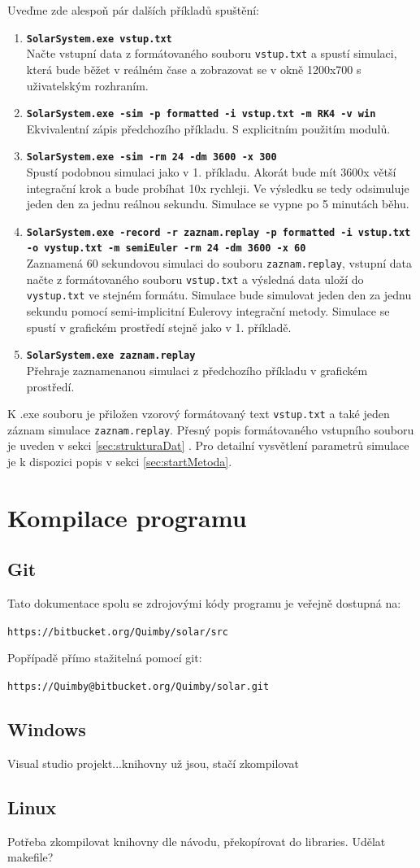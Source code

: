 Uveďme zde alespoň pár dalších příkladů spuštění:
\begin{enumerate}
	\item \texttt{\textbf{SolarSystem.exe vstup.txt}} \\
	Načte vstupní data z formátovaného souboru \texttt{vstup.txt} a spustí simulaci, která bude běžet v reálném čase a zobrazovat se v okně 1200x700 s uživatelským rozhraním.
	\item \texttt{\textbf{SolarSystem.exe -sim -p formatted -i vstup.txt -m RK4 -v win}} \\
	 Ekvivalentní zápis předchozího příkladu. S explicitním použitím modulů.
	\item \texttt{\textbf{SolarSystem.exe -sim -rm 24 -dm 3600 -x 300}} \\
	Spustí podobnou simulaci jako v 1. příkladu. Akorát bude mít 3600x větší integrační krok a bude probíhat 10x rychleji. Ve výsledku se tedy odsimuluje jeden den za jednu reálnou sekundu. Simulace se vypne po 5 minutách běhu.
	\item \texttt{\textbf{SolarSystem.exe -record -r zaznam.replay -p formatted -i vstup.txt -o vystup.txt -m semiEuler -rm 24 -dm 3600 -x 60}}\\
	Zaznamená 60 sekundovou simulaci do souboru \texttt{zaznam.replay}, vstupní data načte z formátovaného souboru \texttt{vstup.txt} a výsledná data uloží do \texttt{vystup.txt} ve stejném formátu. Simulace bude simulovat jeden den za jednu sekundu pomocí semi-implicitní Eulerovy integrační metody. Simulace se spustí v grafickém prostředí stejně jako v 1. příkladě.
	\item  \texttt{\textbf{SolarSystem.exe zaznam.replay}}\\
	Přehraje zaznamenanou simulaci z předchozího příkladu v grafickém prostředí.
\end{enumerate}
K .exe souboru je přiložen vzorový formátovaný text \texttt{vstup.txt} a také jeden záznam simulace \texttt{zaznam.replay}.
Přesný popis formátovaného vstupního souboru je uveden v sekci \ref{sec:strukturaDat} . Pro detailní vysvětlení parametrů simulace je k dispozici popis v sekci \ref{sec:startMetoda}.


\chapter{Kompilace programu}
\section{Git}
Tato dokumentace spolu se zdrojovými kódy programu je veřejně dostupná na:
\begin{center}
\texttt{https://bitbucket.org/Quimby/solar/src}
\end{center}
Popřípadě přímo stažitelná pomocí git:
\begin{center}
	\texttt{https://Quimby@bitbucket.org/Quimby/solar.git}
\end{center}
\section{Windows}
Visual studio projekt...knihovny už jsou, stačí zkompilovat
\section{Linux}
Potřeba zkompilovat knihovny dle návodu, překopírovat do libraries.
Udělat makefile?